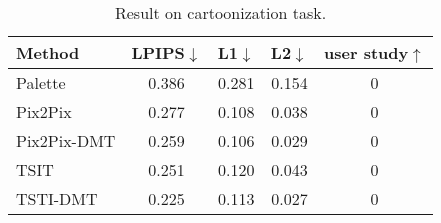 \begin{table}[ht]
\small
\renewcommand\arraystretch{.4}
\centering
\vspace{-10pt}
\caption{
    Result on cartoonization task.
}
\label{tab:compare1}
\vspace{-10pt}
\begin{tabular}{l|cccc}
\toprule
Method & \textbf{LPIPS$\downarrow$} & \textbf{L1$\downarrow$} & \textbf{L2$\downarrow$} & \textbf{user study$\uparrow$} \\
\midrule
Palette     & 0.386  & 0.281  & 0.154 & 0  \\
\midrule
Pix2Pix     & 0.277  & 0.108  & 0.038 & 0  \\
Pix2Pix-DMT & 0.259  & 0.106  & 0.029 & 0  \\
\midrule
TSIT        & 0.251  & 0.120  & 0.043 & 0  \\
TSTI-DMT    & 0.225  & 0.113  & 0.027 & 0  \\
\bottomrule
\end{tabular}
\end{table}
